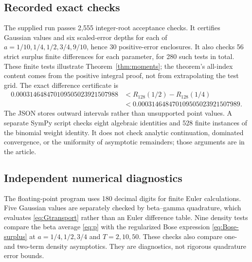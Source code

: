 \documentclass[11pt]{article}
\numberwithin{equation}{section}
\theoremstyle{definition}\newtheorem{definition}[theorem]{Definition}
\theoremstyle{remark}\newtheorem{remark}[theorem]{Remark}
\begin{document}
\subsection{Recorded exact checks}
The supplied run passes 2,555 integer-root acceptance checks. It
certifies Gaussian values and six scaled-error depths for each of
$a=1/10,1/4,1/2,3/4,9/10$, hence 30 positive-error enclosures. It also
checks 56 strict surplus finite differences for each parameter, for
280 such tests in total. These finite tests illustrate
Theorem~\ref{thm:moments}; the theorem's all-index content comes from
the positive integral proof, not from extrapolating the test grid.
The exact difference certificate is
\begin{equation}\label{eq:reversaldiff}
 \begin{split}
 0.000314648470109505023921507988
 &<R_{128}(1/2)-R_{128}(1/4)\\
 &<0.000314648470109505023921507989.
 \end{split}
\end{equation}
The JSON stores outward intervals rather than unsupported point values.
A separate SymPy script checks eight algebraic identities and 528 finite
instances of the binomial weight identity. It does not check analytic
continuation, dominated convergence, or the uniformity of asymptotic
remainders; those arguments are in the article.

\subsection{Independent numerical diagnostics}
The floating-point program uses 180 decimal digits for finite Euler
calculations. Five Gaussian values are separately checked by
beta--gamma quadrature, which evaluates \eqref{eq:Gtransport} rather
than an Euler difference table. Nine density tests compare the beta
average \eqref{eq:p} with the regularized Bose expression
\eqref{eq:Bose-surplus} at $a=1/4,1/2,3/4$ and $T=2,10,50$.
These checks also compare one- and two-term density asymptotics.
They are diagnostics, not rigorous quadrature error bounds.
\end{document}
